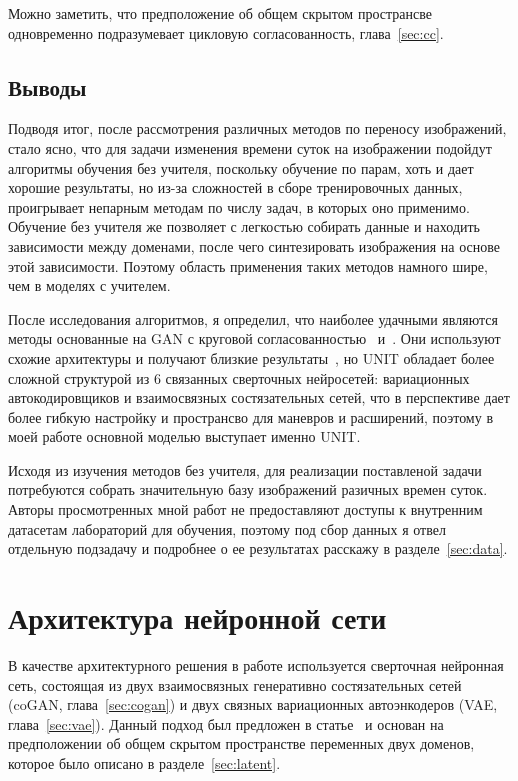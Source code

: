 \documentclass[11pt,a4paper]{extarticle}
\begin{document}
{			\noindent
			Можно заметить, что предположение об общем скрытом пространсве одновременно подразумевает цикловую согласованность, глава~\ref{sec:cc}. 


	\subsection{Выводы}

		Подводя итог, после рассмотрения различных методов по переносу изображений, стало ясно, что для задачи изменения времени суток на изображении подойдут
		алгоритмы обучения без учителя, поскольку обучение по парам, хоть и дает хорошие результаты, но из-за сложностей в сборе тренировочных данных, проигрывает непарным методам по числу задач, в которых оно применимо.
		Обучение без учителя же позволяет с легкостью собирать данные и находить зависимости между доменами, после чего синтезировать изображения на основе этой зависимости.
		Поэтому область применения таких методов намного шире, чем в моделях с учителем. 
		
		После исследования алгоритмов, я определил, что наиболее удачными являются методы основанные на GAN с круговой согласованностью~\cite[CycleGAN]{CycleGAN} и~\cite[UNIT]{UNIT}.
		Они используют схожие архитектуры и получают близкие результаты~\cite{UNIT_vs_CycleGAN},
		но UNIT обладает более сложной структурой из 6 связанных сверточных нейросетей: вариационных автокодировщиков и взаимосвязных состязательных сетей,
		что в перспективе дает более гибкую настройку и пространсво для маневров и расширений, поэтому в моей работе основной моделью выступает именно UNIT.
		
		Исходя из изучения методов без учителя, для реализации поставленой задачи потребуются собрать значительную базу изображений разичных времен суток.
		Авторы просмотренных мной работ не предоставляют доступы к внутренним датасетам лабораторий для обучения, поэтому под сбор данных я отвел отдельную подзадачу и подробнее о ее результатах расскажу в разделе~\ref{sec:data}.


\newpage
\section{Архитектура нейронной сети}\label{sec:model}

		В качестве архитектурного решения в работе используется сверточная нейронная сеть, состоящая из двух взаимосвязных генеративно состязательных сетей (coGAN, глава~\ref{sec:cogan}) и двух связных вариационных автоэнкодеров (VAE, глава~\ref{sec:vae}).
		Данный подход был предложен в статье~\cite{UNIT} и основан на предположении об общем скрытом пространстве переменных двух доменов, которое было описано в разделе~\ref{sec:latent}.
		
}
\end{document}
